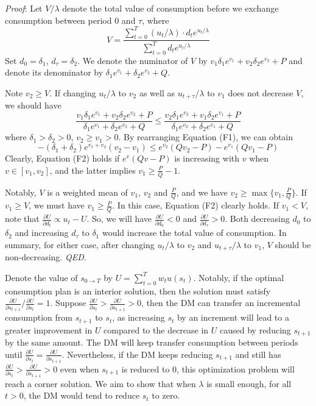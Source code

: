 \noindent \emph{Proof}: Let \(V/\lambda\) denote the total value of
consumption before we exchange consumption between period 0 and
\(\tau\), where\[
V = \frac{\sum_{t=0}^T (u_t/\lambda)\cdot d_t e^{u_t/\lambda}}{\sum_{t=0}^T d_te^{u_t/\lambda}}
\]Set \(d_0=\delta_1\), \(d_\tau=\delta_2\). We denote the numinator of
\(V\) by \(v_1\delta_1e^{v_1}+v_2\delta_2e^{v_2}+P\) and denote its
denominator by \(\delta_1e^{v_1}+\delta_2e^{v_2}+Q\).

Note \(v_2\geq V\). If changing \(u_t/\lambda\) to \(v_2\) as well as
\(u_{t+\tau}/\lambda\) to \(v_1\) does not decrease \(V\), we should
have
\[\tag{F1} \frac{v_1\delta_1e^{v_1}+ v_2\delta_2e^{v_2}+P}{\delta_1e^{v_1}+\delta_2e^{v_2}+Q} \leq  \frac{v_2\delta_1e^{v_2}+ v_1\delta_2e^{v_1}+P}{\delta_1e^{v_2}+\delta_2e^{v_1}+Q} \]where
\(\delta_1>\delta_2>0\), \(v_2\geq v_1>0\). By rearranging Equation
(F1), we can
obtain\[\tag{F2} -(\delta_1+\delta_2)e^{v_1+v_2}(v_2-v_1)\leq e^{v_2}(Qv_2-P)-e^{v_1}(Qv_1-P) \]Clearly,
Equation (F2) holds if \(e^v(Qv-P)\) is increasing with \(v\) when
\(v\in[v_1,v_2]\), and the latter implies \(v_1\geq \frac{P}{Q}-1\).

Notably, \(V\) is a weighted mean of \(v_1\), \(v_2\) and
\(\frac{P}{Q}\), and we have \(v_2\geq \max\{v_1,\frac{P}{Q}\}\). If
\(v_1\geq V\), we must have \(v_1\geq \frac{P}{Q}\). In this case,
Equation (F2) clearly holds. If \(v_1<V\), note that
\(\frac{\partial U}{\partial d_t}\propto u_t-U\). So, we will have
\(\frac{\partial U}{\partial d_0}<0\) and
\(\frac{\partial U}{\partial d_\tau}>0\). Both decreasing \(d_0\) to
\(\delta_2\) and increasing \(d_\tau\) to \(\delta_1\) would increase
the total value of consumption. In summary, for either case, after
changing \(u_t/\lambda\) to \(v_2\) and \(u_{t+\tau}/\lambda\) to
\(v_1\), \(V\) should be non-decreasing. \emph{QED}.

Denote the value of \(s_{0\rightarrow T}\) by
\(U=\sum_{t=0}^T w_t u(s_t)\). Notably, if the optimal consumption plan
is an interior solution, then the solution must satisfy
\(\frac{\partial U}{\partial s_{t+1}}/\frac{\partial U}{\partial s_{t}}=1\).
Suppose
\(\frac{\partial U}{\partial s_t}>\frac{\partial U}{\partial s_{t+1}}>0\),
then the DM can transfer an incremental consumption from \(s_{t+1}\) to
\(s_t\), as increasing \(s_t\) by an increment will lead to a greater
improvement in \(U\) compared to the decrease in \(U\) caused by
reducing \(s_{t+1}\) by the same amount. The DM will keep transfer
consumption between periods until
\(\frac{\partial U}{\partial s_t}=\frac{\partial U}{\partial s_{t+1}}\).
Nevertheless, if the DM keeps reducing \(s_{t+1}\) and still has
\(\frac{\partial U}{\partial s_t}>\frac{\partial U}{\partial s_{t+1}}>0\)
even when \(s_{t+1}\) is reduced to 0, this optimization problem will
reach a corner solution. We aim to show that when \(\lambda\) is small
enough, for all \(t>0\), the DM would tend to reduce \(s_t\) to zero.


